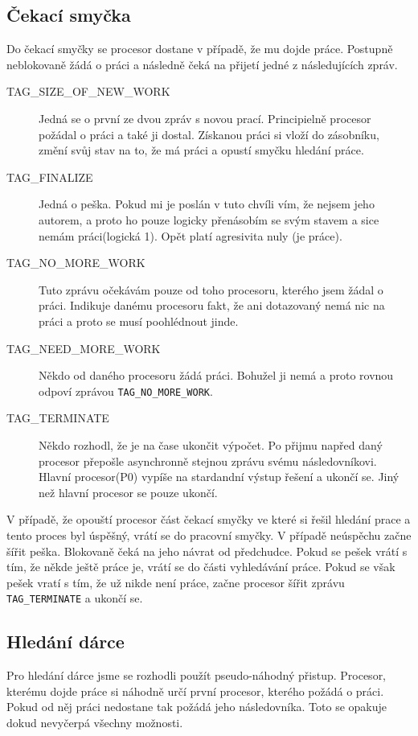 \documentclass[12pt]{article}
\begin{document}
\subsection{Čekací smyčka}
Do čekací smyčky se procesor dostane v případě, že mu dojde práce. Postupně
neblokovaně žádá o práci a následně čeká na přijetí jedné z následujících zpráv.
\begin{description}
  \item [TAG\_SIZE\_OF\_NEW\_WORK] Jedná se o první ze dvou zpráv s novou prací.
Principielně procesor požádal o práci a také ji dostal. Získanou práci si vloží
do zásobníku, změní svůj stav na to, že má práci a opustí smyčku hledání práce.
  \item [TAG\_FINALIZE] Jedná o peška. Pokud mi je poslán v tuto chvíli vím, že
nejsem jeho autorem, a proto ho pouze logicky přenásobím se svým stavem a sice
nemám práci(logická 1). Opět platí agresivita nuly (je práce).  
  \item [TAG\_NO\_MORE\_WORK] Tuto zprávu očekávám pouze od toho procesoru,
kterého jsem žádal o práci. Indikuje danému procesoru fakt, že ani dotazovaný
nemá nic na práci a proto se musí poohlédnout jinde.
  \item [TAG\_NEED\_MORE\_WORK] Někdo od daného procesoru žádá práci. Bohužel
ji nemá a proto rovnou odpoví zprávou \verb|TAG_NO_MORE_WORK|.
   \item [TAG\_TERMINATE] Někdo rozhodl, že je na čase ukončit výpočet. Po
přijmu napřed daný procesor přepošle asynchronně stejnou zprávu svému
následovníkovi. Hlavní procesor(P0) vypíše na stardandní výstup
řešení a ukončí se. Jiný než hlavní procesor se pouze ukončí.
\end{description}
V případě, že opouští procesor část čekací smyčky ve které si řešil hledání
prace a tento proces byl úspěšný, vrátí se do pracovní smyčky. V případě
neúspěchu začne šířit peška. Blokovaně čeká na jeho návrat od předchudce. Pokud
se pešek vrátí s tím, že někde ještě práce je, vrátí se do části vyhledávání
práce. Pokud se však pešek vratí s tím, že už nikde není práce, začne
procesor šířit zprávu  \verb|TAG_TERMINATE| a ukončí se.
\subsection{Hledání dárce}
Pro hledání dárce jsme se rozhodli použít pseudo-náhodný přistup. Procesor,
kterému dojde práce si náhodně určí první procesor, kterého požádá o práci.
Pokud od něj práci nedostane tak požádá jeho následovníka. Toto se opakuje
dokud nevyčerpá všechny možnosti.
\end{document}
